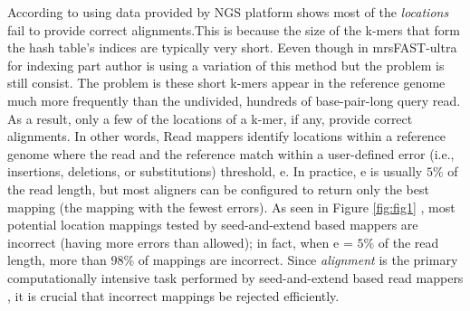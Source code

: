 According to \cite{fasthash} using data provided by NGS platform shows most of the \textit{locations} fail to provide correct alignments.This is because the size of the k-mers that form the hash table’s indices are typically very short. Eeven though in mrsFAST-ultra\cite{mrsfastultra} for indexing part author is using a variation of this method but the problem is still consist. The problem is these short k-mers appear in the reference genome much more frequently than the undivided, hundreds of base-pair-long query read. As a result, only a few of the locations of a k-mer, if any, provide correct alignments. In other words, Read mappers identify locations within a reference genome where the read and the reference match within a user-defined error (i.e., insertions, deletions, or substitutions) threshold, e. In practice, e is usually $5\%$ of the read length, but most aligners can be configured to return only the best mapping (the mapping with the fewest errors). As seen in Figure \ref{fig:fig1} \cite{shd}, most potential location mappings tested by seed-and-extend based mappers are incorrect (having more errors than allowed); in fact, when e = $5\%$ of the read length, more than $98\%$ of mappings are incorrect. Since \emph{alignment} is the primary computationally intensive task performed by seed-and-extend based read mappers \cite{fasthash}, it is crucial that incorrect mappings be rejected efficiently. 
  
  
  
  
  
  
  
  
  
  
  
  
  